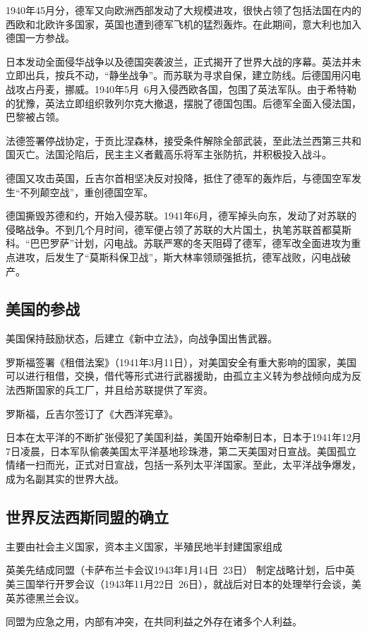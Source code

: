 1940年45月分，德军又向欧洲西部发动了大规模进攻，很快占领了包括法国在内的西欧和北欧许多国家，英国也遭到德军飞机的猛烈轰炸。在此期间，意大利也加入德国一方参战。

日本发动全面侵华战争以及德国突袭波兰，正式揭开了世界大战的序幕。英法并未立即出兵，按兵不动，“静坐战争”。而苏联为寻求自保，建立防线。后德国用闪电战攻占丹麦，挪威。1940年5月~6月入侵西欧各国，包围了英法军队。由于希特勒的犹豫，英法立即组织敦列尔克大撤退，摆脱了德国包围。后德军全面入侵法国，巴黎被占领。

法德签署停战协定，于贡比涅森林，接受条件解除全部武装，至此法兰西第三共和国灭亡。法国沦陷后，民主主义者戴高乐将军主张防抗，并积极投入战斗。

德国又攻击英国，丘吉尔首相坚决反对投降，抵住了德军的轰炸后，与德国空军发生“不列颠空战”，重创德国空军。

德国撕毁苏德和约，开始入侵苏联。1941年6月，德军掉头向东，发动了对苏联的侵略战争。不到几个月时间，德军便占领了苏联的大片国土，执笔苏联首都莫斯科。“巴巴罗萨”计划，闪电战。苏联严寒的冬天阻碍了德军，德军改全面进攻为重点进攻，后发生了“莫斯科保卫战”，斯大林率领顽强抵抗，德军战败，闪电战破产。

\subsection{美国的参战}
美国保持鼓励状态，后建立《新中立法》，向战争国出售武器。

罗斯福签署《租借法案》（1941年3月11日），对美国安全有重大影响的国家，美国可以进行租借，交换，借代等形式进行武器援助，由孤立主义转为参战倾向成为反法西斯国家的兵工厂，并且给苏联提供了军资。

罗斯福，丘吉尔签订了《大西洋宪章》。

日本在太平洋的不断扩张侵犯了美国利益，美国开始牵制日本，日本于1941年12月7日凌晨，日本军队偷袭美国太平洋基地珍珠港，第二天美国对日宣战。美国孤立情绪一扫而光，正式对日宣战，包括一系列太平洋国家。至此，太平洋战争爆发，成为名副其实的世界大战。

\subsection{世界反法西斯同盟的确立}
主要由社会主义国家，资本主义国家，半殖民地半封建国家组成

英美先结成同盟（卡萨布兰卡会议1943年1月14日~23日） 制定战略计划，后中英美三国举行开罗会议（1943年11月22日~26日），就战后对日本的处理举行会谈，美英苏德黑兰会议。

同盟为应急之用，内部有冲突，在共同利益之外存在诸多个人利益。

